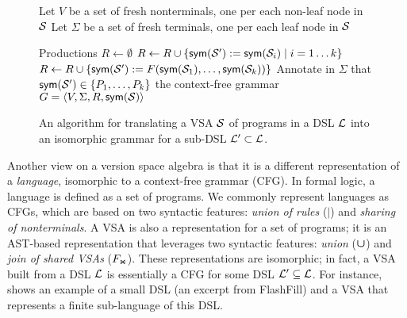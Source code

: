 \begin{figure}[t]
    \centering
    \small
    \begin{algorithmic}[1]
            \State Let $V$ be a set of fresh nonterminals, one per each non-leaf node in $\mathcal{S}$
            \State Let $\Sigma$ be a set of fresh terminals, one per each leaf node in $\mathcal{S}$
            \State {}
            \addtocounter{ALG@line}{-1}
            \WithNumber \State Productions $R \gets \emptyset$
            \State {}
                \State $R \gets R \cup \{ \mathsf{sym}(\mathcal{S}') := \mathsf{sym}(\mathcal{S}_i) \mid i = 1 \dots k \}$
            \EndFor
            \State {}
                \State $R \gets R \cup \{ \mathsf{sym}(\mathcal{S}') := F(\mathsf{sym}(\mathcal{S}_1), \dots, \mathsf{sym}(\mathcal{S}_k)) \}$
            \EndFor
            \State {}
                \State Annotate in $\Sigma$ that $\mathsf{sym}(\mathcal{S}') \in \{ P_1, \dots, P_k \}$
            \EndFor
            \State \Return the context-free grammar $G = \langle V, \Sigma, R, \mathsf{sym}(\mathcal{S})\rangle$
        \EndFunction
    \end{algorithmic}
    \caption{An algorithm for translating a VSA $\mathcal{S}$ of programs in a DSL $\mathcal{L}$ into an isomorphic grammar for a
        sub-DSL $\mathcal{L}' \subset \mathcal{L}$.}
    \label{fig:vsa:incremental}
\end{figure}

Another view on a version space algebra is that it is a different representation of a \emph{language}, isomorphic to a
context-free grammar (CFG).
In formal logic, a language is defined as a set of programs.
We commonly represent languages as CFGs, which are based on two syntactic features: \emph{union of rules} ($|$) and
\emph{sharing of nonterminals}.
A VSA is also a representation for a set of programs; it is an AST-based representation that leverages
two syntactic features: \emph{union} ($\bm{\mathsf{\cup}}$) and \emph{join of shared VSAs} ($F_{\text{\scriptsize\ensuremath{\Join}}}$).
These representations are isomorphic; in fact, a VSA built from a DSL $\mathcal{L}$ is essentially a CFG for some DSL $\mathcal{L}'
\subseteq \mathcal{L}$.
For instance,  shows an example of a small DSL (an excerpt from FlashFill) and a VSA that
represents a finite sub-language of this DSL.

